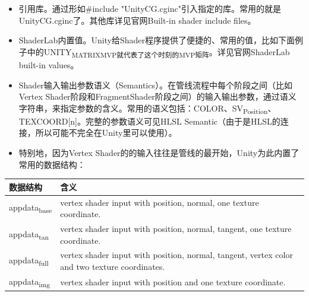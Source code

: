 \documentclass[9pt, b5paper]{article}
\begin{document}
\begin{itemize}
\item 引用库。通过形如\#include "UnityCG.cginc"引入指定的库。常用的就是UnityCG.cginc了。其他库详见官网Built-in shader include files。
\item ShaderLab内置值。Unity给Shader程序提供了便捷的、常用的值，比如下面例子中的UNITY\textsubscript{MATRIX}\textsubscript{MVP就代表了这个时刻的MVP矩阵}。详见官网ShaderLab built-in values。
\item Shader输入输出参数语义（Semantics）。在管线流程中每个阶段之间（比如Vertex Shader阶段和FragmentShader阶段之间）的输入输出参数，通过语义字符串，来指定参数的含义。常用的语义包括：COLOR、SV\textsubscript{Position}、TEXCOORD[n]。完整的参数语义可见HLSL Semantic（由于是HLSL的连接，所以可能不完全在Unity里可以使用）。
\item 特别地，因为Vertex Shader的的输入往往是管线的最开始，Unity为此内置了常用的数据结构：
\end{itemize}
\begin{center}
\begin{tabular}{ll}
\hline
数据结构 & 含义\\
\hline
appdata\textsubscript{base} & vertex shader input with position, normal, one texture coordinate.\\
appdata\textsubscript{tan} & vertex shader input with position, normal, tangent, one texture coordinate.\\
appdata\textsubscript{full} & vertex shader input with position, normal, tangent, vertex color and two texture coordinates.\\
appdata\textsubscript{img} & vertex shader input with position and one texture coordinate.\\
\hline
\end{tabular}
\end{center}
\end{document}
